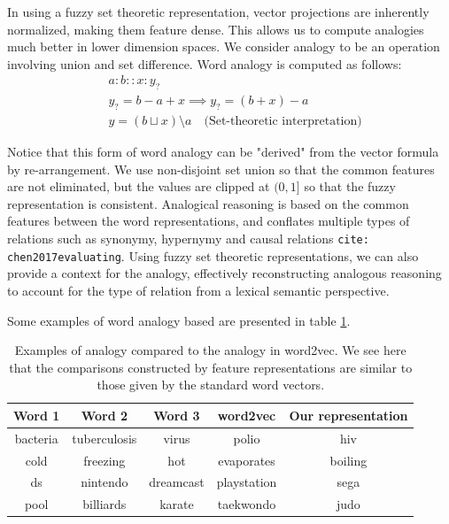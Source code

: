 \documentclass{book}
\newcommand{\citep}[1]{\texttt{cite: #1}}
\begin{document}
In using a fuzzy set theoretic representation, vector projections are
inherently normalized, making them feature dense. This allows us to compute
analogies much better in lower dimension spaces. We consider analogy to be an
operation involving union and set difference. Word analogy is computed as
follows:
\begin{equation*}
\begin{split}
    &a : b :: x : y_? \\
    &y_? = b - a + x \implies y_? = (b + x) - a \\
    &y = (b \sqcup x) \setminus a \quad \text{(Set-theoretic interpretation)}
\end{split}
\end{equation*}

Notice that this form of word analogy can be "derived" from the vector formula
by re-arrangement. We use non-disjoint set union so that the common features
are not eliminated, but the values are clipped at $(0,1]$ so that the fuzzy
representation is consistent. Analogical reasoning is based on the common
features between the word representations, and conflates multiple types of
relations such as synonymy, hypernymy and causal relations
\citep{chen2017evaluating}. Using fuzzy set theoretic representations, we can
also provide a context for the analogy, effectively reconstructing analogous
reasoning to account for the type of relation from a lexical semantic
perspective.

Some examples of word analogy based are presented in table \ref{tab: analogy}. 

\begin{table}[]
    \centering
    {\tiny
    \begin{tabular}{ccc|c|c}
        \bf Word 1  & \bf Word 2    & \bf Word 3    & \bf word2vec  & \bf Our representation    \\ \hline
        bacteria    & tuberculosis  & virus         & polio         & hiv                       \\
        cold        & freezing      & hot           & evaporates    & boiling                   \\
        ds          & nintendo      & dreamcast     & playstation   & sega                      \\
        pool        & billiards     & karate        & taekwondo     & judo                      \\
    \end{tabular}
    }
    \caption{Examples of analogy compared to the analogy in word2vec. We see here that the comparisons constructed by feature representations are similar to those given by the standard word vectors.}
    \label{tab: analogy}
\end{table}
\end{document}
